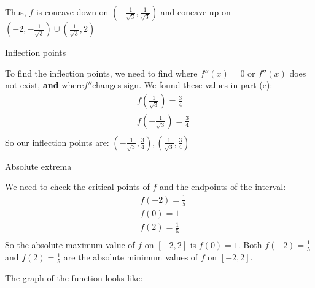 \documentclass[nooutcomes]{ximera}
\renewenvironment{freeResponse}{
\ifhandout\setbox0\vbox\bgroup\else
\begin{trivlist}\item[\hskip \labelsep\bfseries Solution:\hspace{2ex}]
\fi}
{\ifhandout\egroup\else
\end{trivlist}
\fi}
\newcommand{\dfn}{\textbf}
\begin{document}
\begin{problem}
\begin{enumerate}
\begin{freeResponse}
		
		
		Thus, $f$ is concave down on $\left( - \frac{1}{\sqrt{3}}, \frac{1}{\sqrt{3}} \right)$ and concave up on \\ 
		$\left( -2, - \frac{1}{\sqrt{3}} \right) \cup \left( \frac{1}{\sqrt{3}}, 2 \right)$
		\end{freeResponse}
		
	\item  Inflection points
	
		\begin{freeResponse}
		To find the inflection points, we need to find where $f''(x)=0$ or $f''(x)$ does not exist, \dfn{and} where$f''$changes sign.  We found these values in part (e):
		\begin{align*}
 		 & f\left( \frac{1}{\sqrt{3}} \right)=\frac{3}{4} \\ 
 		& f\left( -\frac{1}{\sqrt{3}} \right)=\frac{3}{4} \\ 
		\end{align*}  
		So our inflection points are: $\left( -\frac{1}{\sqrt{3}},\frac{3}{4} \right),\left( \frac{1}{\sqrt{3}},\frac{3}{4} \right)$
		\end{freeResponse}
		
	\item  Absolute extrema
	
		\begin{freeResponse}
		We need to check the critical points of $f$ and the endpoints of the interval:
		\begin{align*}
  		& f(-2)=\frac{1}{5} \\ 
 		& f(0)=1 \\ 
 		& f(2)=\frac{1}{5} \\ 
		\end{align*}
		So the absolute maximum value of $f$ on $[-2,2]$ is $f(0)=1$.  Both $f(-2)=\frac{1}{5}$ and $f(2)=\frac{1}{5}$ are the absolute minimum values of $f$ on $[-2,2]$.
		
		The graph of the function looks like:
		
\begin{center}
\begin{image}
\end{image}
\end{center}
\end{freeResponse}
\end{enumerate}
\end{problem}
\end{document}
